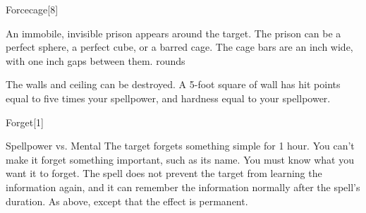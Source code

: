 \begin{spellsection}{Forcecage}[8]
    \begin{spellheader}
    \end{spellheader}
    \begin{spellcontent}
        \begin{spelltargetinginfo}
        \end{spelltargetinginfo}
        \begin{spelleffects}
            \spelleffect An immobile, invisible prison appears around the target. The prison can be a perfect sphere, a perfect cube, or a barred cage. The cage bars are an inch wide, with one inch gaps between them.
             rounds
        \end{spelleffects}
    \end{spellcontent}
    \begin{spellfooter}
        \spellnotes The walls and ceiling can be destroyed. A 5-foot square of wall has hit points equal to five times your spellpower, and hardness equal to your spellpower.
        \miscastrandom
    \end{spellfooter}
\end{spellsection}

\begin{spellsection}{Forget}[1]
    \begin{spellheader}
    \end{spellheader}
    \begin{spellcontent}
        \begin{spelltargetinginfo}
        \end{spelltargetinginfo}
        \begin{spelleffects}
            \begin{spellattack}{Spellpower vs. Mental}
                \spellsuccess The target forgets something simple for 1 hour. You can't make it forget something important, such as its name. You must know what you want it to forget. The spell does not prevent the target from learning the information again, and it can remember the information normally after the spell's duration.
                \spellcritical As above, except that the effect is permanent.
            \end{spellattack}
            \spelldur \durlong
        \end{spelleffects}
    \end{spellcontent}
    \begin{spellfooter}
        \miscastrandom
    \end{spellfooter}
    \begin{spellaugments}
    \end{spellaugments}
\end{spellsection}

